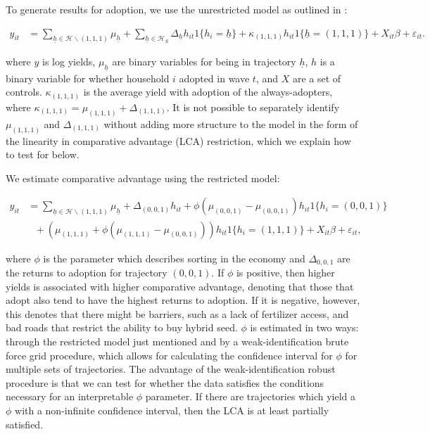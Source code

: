 \documentclass{article}
\begin{document}
To generate results for adoption, we use the unrestricted model as outlined in \cite{Tjernstrom_Emilia_Dalia_Ghanem_Oscar_Barriga_Cabanillas_Travis_J_Lybbert_Jeffrey_D_Michler_and_Aleksandr_Michuda2020-bc}:

\begin{align}
y_{it}&=\sum_{\underline{h}\in\mathcal{H}\backslash (1,1,1)}\mu_{\underline{h}}+\sum_{\underline{h}\in\mathcal{H}_{S}}\Delta_{\underline{h}}h_{it}1\{h_{i}=\underline{h}\} + \kappa_{(1,1,1)}h_{it}1\{\underline{h}=(1,1,1)\}+ X_{it}\beta+\varepsilon_{it}.\label{eq:GRC}
\end{align}

where $y$ is log yields, $\mu_{\underline{h}}$ are binary variables for being in trajectory $\underline{h}$, $h$ is a binary variable for whether household $i$ adopted in wave $t$, and $X$ are a set of controls. $\kappa_{(1,1,1)}$ is the average yield with adoption of the always-adopters, where $\kappa_{(1,1,1)} = \mu_{(1,1,1)} + \Delta_{(1,1,1)}$. It is not possible to separately identify $\mu_{(1,1,1)}$ and $\Delta_{(1,1,1)}$ without adding more structure to the model in the form of the linearity in comparative advantage (LCA) restriction, which we explain how to test for below.


We estimate comparative advantage using the restricted model:

\begin{align}
y_{it}&=\sum_{\underline{h}\in\mathcal{H}\backslash (1,1,1)}\mu_{\underline{h}}+\Delta_{(0,0,1)}h_{it}+\phi(\mu_{(0,0,1)}-\mu_{(0,0,1)})h_{it}1\{h_{i}=(0,0,1)\}\nonumber\\
&~~~+\left(\mu_{(1,1,1)}+\phi\left(\mu_{(1,1,1)}-\mu_{(0,0,1)}\right)\right)h_{it}1\{h_{i}=(1,1,1)\} + X_{it}\beta +\varepsilon_{it},\label{eq:GRC_Suri}
\end{align}

where $\phi$ is the parameter which describes sorting in the economy and $\Delta_{0,0,1}$ are the returns to adoption for trajectory $(0,0,1)$. If $\phi$ is positive, then higher yields is associated with higher comparative advantage, denoting that those that adopt also tend to have the highest returns to adoption. If it is negative, however, this denotes that there might be barriers, such as a lack of fertilizer access, and bad roads that restrict the ability to buy hybrid seed. $\phi$ is estimated in two ways: through the restricted model just mentioned and by a weak-identification brute force grid procedure, which allows for calculating the confidence interval for $\phi$ for multiple sets of trajectories. The advantage of the weak-identification robust procedure is that we can test for whether the data satisfies the conditions necessary for an interpretable $\phi$ parameter. If there are trajectories which yield a $\phi$ with a non-infinite confidence interval, then the LCA is at least partially satisfied.
\end{document}

